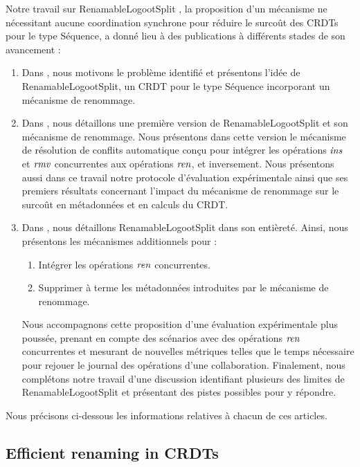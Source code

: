 
Notre travail sur RenamableLogootSplit , \ie la proposition d'un mécanisme ne nécessitant aucune coordination synchrone pour réduire le surcoût des \acp{CRDT} pour le type Séquence, a donné lieu à des publications à différents stades de son avancement :
\begin{enumerate}
    \item Dans \cite{2018-rls-middleware-nicolas}, nous motivons le problème identifié et présentons l'idée de RenamableLogootSplit, un \ac{CRDT} pour le type Séquence incorporant un mécanisme de renommage.
    \item Dans \cite{2020-rls-papoc-nicolas}, nous détaillons une première version de RenamableLogootSplit et son mécanisme de renommage.
        Nous présentons dans cette version le mécanisme de résolution de conflits automatique conçu pour intégrer les opérations $\mathit{ins}$ et $\mathit{rmv}$ concurrentes aux opérations $\mathit{ren}$, et inversement.
        Nous présentons aussi dans ce travail notre protocole d'évaluation expérimentale ainsi que ses premiers résultats concernant l'impact du mécanisme de renommage sur le surcoût en métadonnées et en calculs du \ac{CRDT}.
    \item Dans \cite{2022-rls-tpds-nicolas}, nous détaillons RenamableLogootSplit dans son entièreté.
        Ainsi, nous présentons les mécanismes additionnels pour :
        \begin{enumerate}
            \item Intégrer les opérations $\mathit{ren}$ concurrentes.
            \item Supprimer à terme les métadonnées introduites par le mécanisme de renommage.
        \end{enumerate}
        Nous accompagnons cette proposition d'une évaluation expérimentale plus poussée, prenant en compte des scénarios avec des opérations $\mathit{ren}$ concurrentes et mesurant de nouvelles métriques telles que le temps nécessaire pour rejouer le journal des opérations d'une collaboration.
        Finalement, nous complétons notre travail d'une discussion identifiant plusieurs des limites de RenamableLogootSplit et présentant des pistes possibles pour y répondre.
\end{enumerate}
Nous précisons ci-dessous les informations relatives à chacun de ces articles.

\subsection*{Efficient renaming in CRDTs \cite{2018-rls-middleware-nicolas}}

